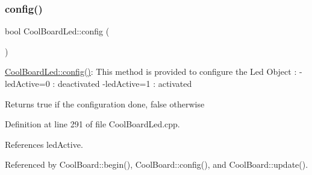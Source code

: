 \subsubsection{\texorpdfstring{config()}{config()}}
{\footnotesize\ttfamily bool Cool\+Board\+Led\+::config (\begin{DoxyParamCaption}{ }\end{DoxyParamCaption})}

\hyperlink{classCoolBoardLed_a1b60e5e30bea96c49ed62ed1bf1ffc8b}{Cool\+Board\+Led\+::config()}\+: This method is provided to configure the Led Object \+: -\/led\+Active=0 \+: deactivated -\/led\+Active=1 \+: activated \begin{DoxyReturn}{Returns}
true if the configuration done, false otherwise 
\end{DoxyReturn}


Definition at line 291 of file Cool\+Board\+Led.\+cpp.



References led\+Active.



Referenced by Cool\+Board\+::begin(), Cool\+Board\+::config(), and Cool\+Board\+::update().


